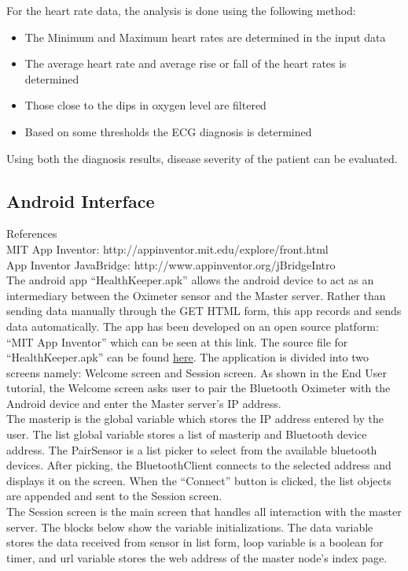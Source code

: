 \documentclass[AMA,STIX1COL]{WileyNJD-v2}
\begin{document}
For the heart rate data, the analysis is done using the following method:
\begin{itemize}
\item The Minimum and Maximum heart rates are determined in the input data
\item The average heart rate and average rise or fall of the heart rates is determined
\item Those close to the dips in oxygen level are filtered
\item Based on some thresholds the ECG diagnosis is determined
\end{itemize}
Using both the diagnosis results, disease severity of the patient can be evaluated.

\subsection{Android Interface}
References \\
MIT App Inventor: http://appinventor.mit.edu/explore/front.html \\
App Inventor JavaBridge: http://www.appinventor.org/jBridgeIntro \\
The android app “HealthKeeper.apk” allows the android device to act as an intermediary between the Oximeter sensor and the Master server. Rather than sending data manually through the GET HTML form, this app records and sends data automatically. The app has been developed on an open source platform: “MIT App Inventor” which can be seen at this link. The source file for “HealthKeeper.apk” can be found \href{https://drive.google.com/open?id=1rPIf_NHuBXp6peUX3vkzqJg5hfht3KDC}{here}. The application is divided into two screens namely: Welcome screen and Session screen. As shown in the End User tutorial, the Welcome screen asks user to pair the Bluetooth Oximeter with the Android device and enter the Master server’s IP address. \\
The masterip is the global variable which stores the IP address entered by the user. The list global variable stores a list of masterip and Bluetooth device address. The PairSensor is a list picker to select from the available bluetooth devices. After picking, the BluetoothClient connects to the selected address and displays it on the screen. When the “Connect” button is clicked, the list objects are appended and sent to the Session screen. \\
The Session screen is the main screen that handles all interaction with the master server. The blocks below show the variable initializations. The data variable stores the data received from sensor in list form, loop variable is a boolean for timer, and url variable stores the web address of the master node’s index page. \\
\end{document}
